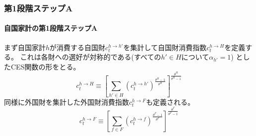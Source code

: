 \subsubsection{第1段階ステップA}
\label{sec:model_households_indices_aggregation_stage1a}

\paragraph{自国家計の第1段階ステップA}
\label{sec:model_households_indices_aggregation_stage1a_home}
まず自国家計\(h\)が消費する自国財\(c_t^{h\to h'}\)を集計して自国財消費指数\(c_t^{h\to H}\)を定義する。
これは各財への選好が対称的である(すべての\(h'\in H\)について\(\alpha_{h'}=1\)) としたCES関数の形をとる。
\begin{equation}
\label{form:model_households_indices_aggregation_stage1a_c_h_H_def}
    c_t^{h\to H}\equiv\left[\sum_{h'\in H}(c_t^{h\to h'})^{\frac{\theta^H-1}{\theta^H}}\right]^{\frac{\theta^H}{\theta^H-1}}
\end{equation}
同様に外国財を集計した外国財消費指数\(c_t^{h\to F}\)も定義される。
\begin{equation}
\label{form:model_households_indices_aggregation_stage1a_c_f_F_def}
    c_t^{h\to F}\equiv\left[\sum_{f\in F}(c_t^{h\to f})^{\frac{\theta^F-1}{\theta^F}}\right]^{\frac{\theta^F}{\theta^F-1}}
\end{equation}

